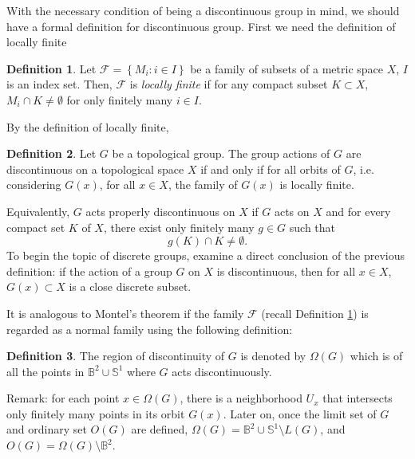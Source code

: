 \documentclass[12pt,oneside]{sfsuthesis}
\theoremstyle{plain} %
\theoremstyle{definition}  %
\newtheorem{definition}{Definition}[chapter]
\theoremstyle{remark}  %
\theoremstyle{plain}
\begin{document}
{With the necessary condition of being a discontinuous group in mind, we should have a formal definition for discontinuous group\cite{katok1992fuchsian, ratcliffe1994foundations, cano2013complex}. First we need the definition of locally finite
\begin{definition}\label{normal family}
Let $\mathcal{F}=\left\lbrace M_i:i\in I\right\rbrace$ be a family of subsets of a metric space $X$, $I$ is an index set. Then, $\mathcal{F}$ is \textit{locally finite} if for any compact subset $K\subset X$, $M_i\cap K\neq\emptyset$ for only finitely many $i\in I$.
\end{definition}
By the definition of locally finite, 
\begin{definition}
Let $G$ be a topological group. The group actions of $G$ are discontinuous on a topological space $X$ if and only if for all orbits of $G$, i.e. considering $G(x)$, for all $x\in X$, the family of $G(x)$ is locally finite.
\end{definition}
Equivalently, $G$ acts properly discontinuous on $X$ if $G$ acts on $X$ and for every compact set $K$ of $X$, there exist only finitely many $g\in G$ such that
$$
g(K)\cap K\neq \emptyset.
$$
To begin the topic of discrete groups, examine a direct conclusion of the previous definition: if the action of a group $G$ on $X$ is discontinuous, then for all $x\in X$, $G(x)\subset X$ is a close discrete subset. 

It is analogous to Montel's theorem if the family $\mathcal{F}$ (recall Definition \ref{normal family}) is regarded as a normal family using the following definition:
\begin{definition}
The region of discontinuity of $G$ is denoted by $\Omega(G)$ which is of all the points in $\mathbb{B}^{2}\cup\mathbb{S}^{1}$ where $G$ acts discontinuously.
\end{definition}
Remark: for each point $x\in\Omega(G)$, there is a neighborhood $U_x$ that intersects only finitely many points in its orbit $G(x)$. Later on, once the limit set of $G$ and ordinary set $O(G)$ are defined, $\Omega(G)=\mathbb{B}^{2}\cup\mathbb{S}^{1}\setminus L(G)$, and $O(G)=\Omega(G)\setminus \mathbb{B}^{2}$.

}
\end{document}
